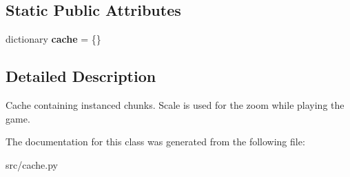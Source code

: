 \subsection*{\-Static \-Public \-Attributes}
\begin{DoxyCompactItemize}
\item 
\hypertarget{classsrc_1_1cache_1_1_chunk_cache_ad737632ad120595e27c9363c88e5767b}{dictionary {\bfseries cache} = \{\}}\label{classsrc_1_1cache_1_1_chunk_cache_ad737632ad120595e27c9363c88e5767b}

\end{DoxyCompactItemize}


\subsection{\-Detailed \-Description}
\begin{DoxyVerb}
Cache containing instanced chunks. Scale is used for the zoom while
playing the game.
\end{DoxyVerb}
 

\-The documentation for this class was generated from the following file\-:\begin{DoxyCompactItemize}
\item 
src/cache.\-py\end{DoxyCompactItemize}
